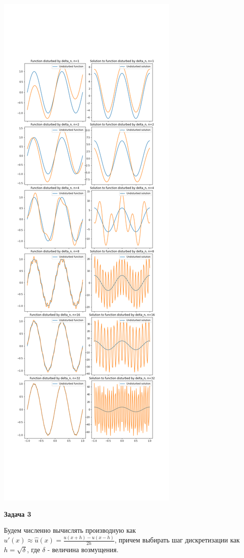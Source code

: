 \documentclass[10pt]{article}
\begin{document}
	\includegraphics[width=.6\textwidth]{Disturbed solution.png}

	
	\bigskip
	
		\textbf{Задача 3}
		
	\medskip
	
	Будем численно вычислять производную как $u'(x) \approx \hat{u}(x) = \frac{u(x+h) - u(x-h) }{2h} $, причем выбирать шаг дискретизации как $h  = \sqrt{\delta}$, где $\delta$ - величина возмущения.
	
\end{document}
